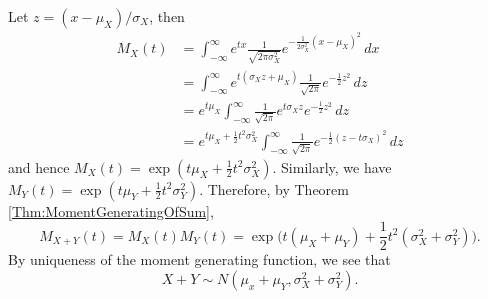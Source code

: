\begin{sol*}
Let $z = (x - \mu_X )/ \sigma_X$, then
    \begin{align*}
        M_X (t) &= \int_{-\infty}^\infty e^{tx} \frac{1}{\sqrt{2\pi \sigma_X^2}} e^{-\frac{1}{2\sigma_X^2} (x - \mu_X)^2} \, dx \\ 
        &= \int_{-\infty}^\infty e^{t (\sigma_X z + \mu_X)} \frac{1}{\sqrt{2\pi}} e^{-\frac{1}{2} z^2} \, dz \\ 
        &= e^{t \mu_X} \int_{-\infty}^\infty \frac{1}{\sqrt{2\pi}} e^{t \sigma_X z} e^{-\frac{1}{2} z^2} \, dz \\ 
        &= e^{t \mu_X + \frac{1}{2} t^2 \sigma_X^2} \int_{-\infty}^\infty \frac{1}{\sqrt{2\pi}} e^{-\frac{1}{2} (z - t \sigma_X)^2} \, dz
    \end{align*}
and hence $M_X (t) = \exp (t \mu_X + \frac{1}{2} t^2 \sigma_X^2 )$. Similarly, we have $M_Y (t) = \exp (t \mu_Y + \frac{1}{2} t^2 \sigma_Y^2 )$. Therefore, by Theorem \ref{Thm:MomentGeneratingOfSum},
    \[
        M_{X + Y} (t) = M_X (t) M_Y (t) = \exp \Big(t (\mu_X + \mu_Y) + \frac{1}{2} t^2 (\sigma_X^2 + \sigma_Y^2 )\Big) .
    \]
By uniqueness of the moment generating function, we see that 
    \begin{equation}
        X + Y \sim N (\mu_x + \mu_Y , \sigma_X^2 + \sigma_Y^2 ).  \tag*{$\triangle$}
    \end{equation}
\end{sol*}

